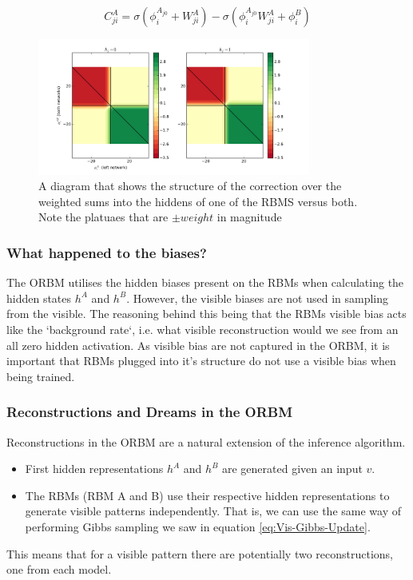 \begin{equation}\label{eq:Approx-Correction}
 C^A_{ji} = \sigma(\phi^{A_{j0}}_i + W^A_{ji}) - \sigma(\phi^{A_{j0}}_i W^A_{ji} + \phi^B_i)
\end{equation}


\begin{figure}[h]
\begin{center}
  \includegraphics[width = 0.8\textwidth]{Assets/correction.png}
\caption{A diagram that shows the structure of the correction over the weighted sums into the hiddens of one of the RBMS versus both. Note the platuaes that are $\pm weight$ in magnitude}
\label{F:Correction-Plot}
\end{center}
\end{figure}

\subsubsection{What happened to the biases?}\label{S:Biases}

The ORBM utilises the hidden biases present on the RBMs when calculating the hidden states $h^A$ and $h^B$. However, the visible biases are not used in sampling from the visible. The reasoning behind this being that the RBMs visible bias acts like the `background rate`, i.e. what visible reconstruction would we see from an all zero hidden activation. As visible bias are not captured in the ORBM, it is important that RBMs plugged into it's structure do not use a visible bias when being trained.

\subsubsection{Reconstructions and Dreams in the ORBM}

Reconstructions in the ORBM are a natural extension of the inference algorithm.
\begin{itemize}
  \item First hidden representations $h^A$ and $ h^B $ are generated given an input $v$.
  \item The RBMs (RBM A and B) use their respective hidden representations to generate visible patterns independently. That is, we can use the same way of performing Gibbs sampling we saw in equation \ref{eq:Vis-Gibbs-Update}.
\end{itemize}
This means that for a visible pattern there are potentially two reconstructions, one from each model.
